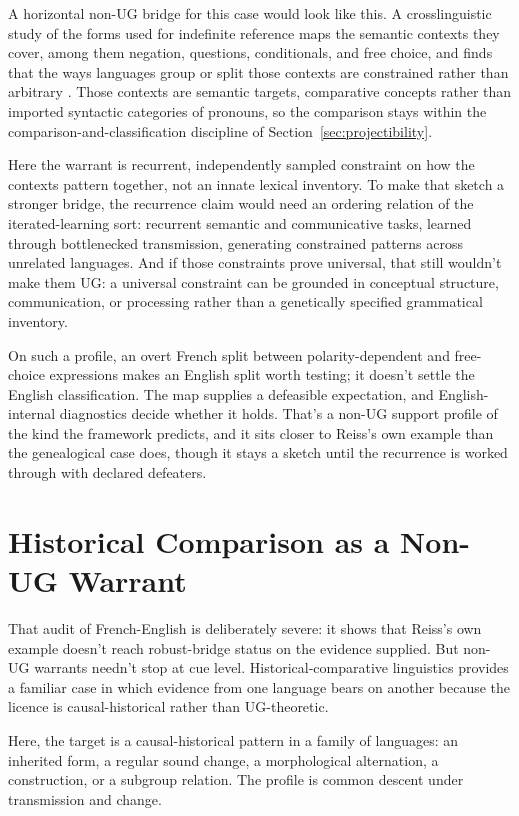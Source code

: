 \documentclass[12pt]{article}
\begin{document}
A horizontal non-UG bridge for this case would look like this. A crosslinguistic study of the forms used for indefinite reference maps the semantic contexts they cover, among them negation, questions, conditionals, and free choice, and finds that the ways languages group or split those contexts are constrained rather than arbitrary \citep{haspelmath1997}. Those contexts are semantic targets, comparative concepts rather than imported syntactic categories of pronouns, so the comparison stays within the comparison-and-classification discipline of Section~\ref{sec:projectibility}.

Here the warrant is recurrent, independently sampled constraint on how the contexts pattern together, not an innate lexical inventory. To make that sketch a stronger bridge, the recurrence claim would need an ordering relation of the iterated-learning sort: recurrent semantic and communicative tasks, learned through bottlenecked transmission, generating constrained patterns across unrelated languages. And if those constraints prove universal, that still wouldn't make them UG: a universal constraint can be grounded in conceptual structure, communication, or processing rather than a genetically specified grammatical inventory.

On such a profile, an overt French split between polarity-dependent and free-choice expressions makes an English split worth testing; it doesn't settle the English classification. The map supplies a defeasible expectation, and English-internal diagnostics decide whether it holds. That's a non-UG support profile of the kind the framework predicts, and it sits closer to Reiss's own example than the genealogical case does, though it stays a sketch until the recurrence is worked through with declared defeaters.

\section{Historical Comparison as a Non-UG Warrant}

That audit of French-English  is deliberately severe: it shows that Reiss's own example doesn't reach robust-bridge status on the evidence supplied. But non-UG warrants needn't stop at cue level. Historical-comparative linguistics provides a familiar case in which evidence from one language bears on another because the licence is causal-historical rather than UG-theoretic.

Here, the target is a causal-historical pattern in a family of languages: an inherited form, a regular sound change, a morphological alternation, a construction, or a subgroup relation. The profile is common descent under transmission and change.
\end{document}
